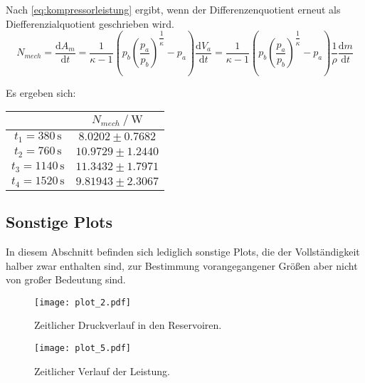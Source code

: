 Nach \eqref{eq:kompressorleistung} ergibt, wenn der Differenzenquotient erneut als Diefferenzialquotient geschrieben wird.
\begin{equation}
N_{mech}= \dfrac{\text{d}A_m}{\text{d}t} = \dfrac{1}{κ-1} \left(p_b\left(\dfrac{p_a}{p_b}\right)^{\dfrac{1}{κ}}-p_a\right) \dfrac{\text{d}V_a}{\text{d}t} = 
    \dfrac{1}{κ-1} \left (p_b \left(\dfrac{p_a}{p_b} \right)^{\dfrac{1}{κ}}-p_a \right) \dfrac{1}{ρ}\dfrac{\text{d}m}{\text{d}t}
\end{equation}

Es ergeben sich:

\begin{table}[H]
  \centering
  \label{tab:kompressorleistung}
  \begin{tabular}{S S}
    \toprule
    & {$N_{mech} \mathbin{/} \unit{\watt}$} \\
    \midrule
    {$t_1 = 380  \, \unit{\second}$} & {$ 8.0202 \pm 0.7682$} \\
    {$t_2 = 760  \, \unit{\second}$} & {$10.9729 \pm 1.2440$} \\
    {$t_3 = 1140 \, \unit{\second}$} & {$11.3432 \pm 1.7971$} \\
    {$t_4 = 1520 \, \unit{\second}$} & {$9.81943 \pm 2.3067$} \\
    \bottomrule
  \end{tabular}
\end{table}


\subsection{Sonstige Plots}

In diesem Abschnitt befinden sich lediglich sonstige Plots, die der Vollständigkeit halber zwar enthalten sind, zur 
Bestimmung vorangegangener Größen aber nicht von großer Bedeutung sind.


\begin{figure}
  \centering
  \texttt{[image: plot\_2.pdf]}
  \caption{Zeitlicher Druckverlauf in den Reservoiren.}
  \label{fig:plot3}
\end{figure}


\begin{figure}
  \centering
  \texttt{[image: plot\_5.pdf]}
  \caption{Zeitlicher Verlauf der Leistung.}
  \label{fig:plot5}
\end{figure}

